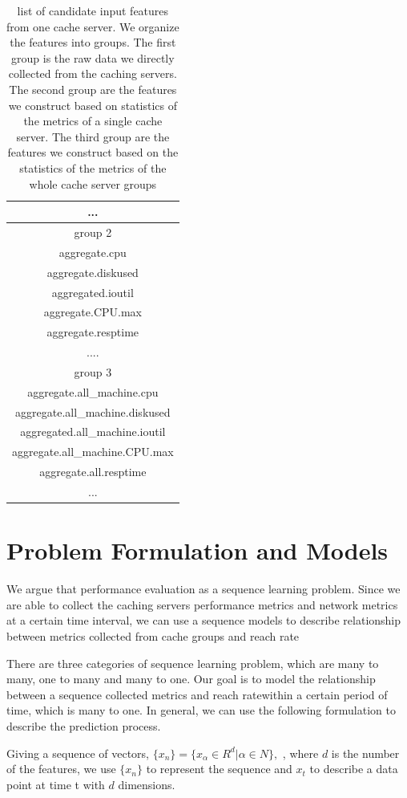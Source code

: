 \documentclass[5p]{elsarticle}
\newcommand{\dabiaolv}{reach rate}
\begin{document}
\begin{table}[]
\begin{tabular}{|c|}
...\\
\hline  
group 2\\
\hline 
aggregate.cpu\\
aggregate.diskused\\
aggregated.ioutil\\
aggregate.CPU.max\\
aggregate.resptime\\
....\\
\hline  
group 3\\
\hline 
aggregate.all\_machine.cpu\\
aggregate.all\_machine.diskused\\
aggregated.all\_machine.ioutil\\
aggregate.all\_machine.CPU.max\\
aggregate.all.resptime\\
...\\
\hline
\end{tabular}
\caption{list of candidate input features from one cache server. We organize the features into groups. The first group is the raw data we directly collected from the caching servers. The second group are the features we construct based on statistics of the metrics of a single cache server. The third group are the features we construct based on the statistics of the metrics of the whole cache server groups}
\label{my-label}
\end{table}

\section{Problem Formulation and Models}
We argue that performance evaluation as a sequence learning problem. Since we are able to collect the caching servers performance metrics and network metrics at a certain time interval, we can use a sequence models to describe relationship between metrics collected from  cache groups and \dabiaolv

There are three categories of sequence learning problem, which are many to many, one to many and many to one. Our goal is to model the relationship between a sequence collected metrics and \dabiaolv within a certain period of time, which is many to one. In general, we can use the following formulation to describe the prediction process.

Giving a sequence of vectors, $\{x_n\}=\{x_{\alpha} \in R^{d}|\alpha \in N\}, $ , where $d$ is the number of the features, we use $\{x_n\}$ to represent the sequence and $x_t$ to describe a data point at time t with $d$ dimensions.
\end{document}
